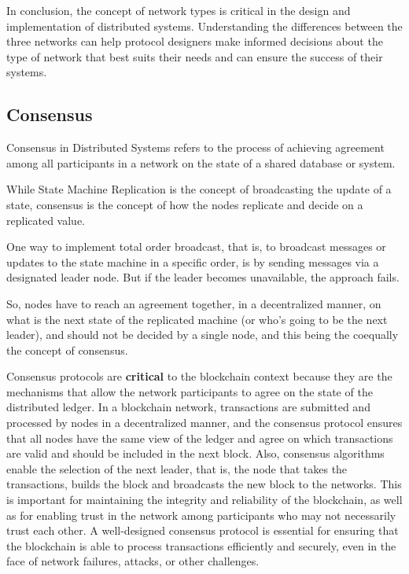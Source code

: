 In conclusion, the concept of network types is critical in the design and implementation of distributed systems. Understanding the differences between the three networks can help protocol designers make informed decisions about the type of network that best suits their needs and can ensure the success of their systems.

\subsection*{\textbf{Consensus}}
Consensus in Distributed Systems refers to the process of achieving agreement among all participants in a network on the state of a shared database or system.

While State Machine Replication is the concept of broadcasting the update of a state, consensus is the concept of how the nodes replicate and decide on a replicated value.

One way to implement total order broadcast, that is, to broadcast messages or updates to the state machine in a specific order, is by sending messages via a designated leader node. But if the leader becomes unavailable, the approach fails. 

So, nodes have to reach an agreement together, in a decentralized manner, on what is the next state of the replicated machine (or who's going to be the next leader), and should not be decided by a single node, and this being the coequally the concept of consensus.

Consensus protocols are \textbf{critical} to the blockchain context because they are the mechanisms that allow the network participants to agree on the state of the distributed ledger. In a blockchain network, transactions are submitted and processed by nodes in a decentralized manner, and the consensus protocol ensures that all nodes have the same view of the ledger and agree on which transactions are valid and should be included in the next block. Also, consensus algorithms enable the selection of the next leader, that is, the node that takes the transactions, builds the block and broadcasts the new block to the networks. 
This is important for maintaining the integrity and reliability of the blockchain, as well as for enabling trust in the network among participants who may not necessarily trust each other. A well-designed consensus protocol is essential for ensuring that the blockchain is able to process transactions efficiently and securely, even in the face of network failures, attacks, or other challenges.




